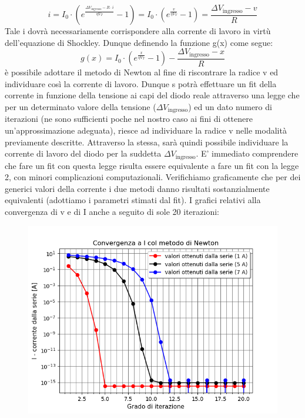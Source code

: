 \documentclass{article}[a4paper, oneside, 11pt]
\begin{document}
\begin{equation}
i = I_0 \cdot ( e^{\frac {\Delta V_{\text{ingresso}} - R \cdot i}{\eta V_T} } - 1) = I_0 \cdot (e^{\frac{v} {\eta V_T}} -1) =  \frac{\Delta V_{\text{ingresso}} - v}{R}
\end{equation}
Tale i dovrà necessariamente corrispondere alla corrente di lavoro in virtù dell’equazione di Shockley. Dunque definendo la funzione g(x) come segue:
\begin{equation}\label{eq: invsck}
g(x) = I_0 \cdot ( e^{\frac{x}{\eta V_T}} - 1)  - \frac {\Delta V_{\text{ingresso}} - x}{R}
\end{equation}
è possibile adottare il metodo di Newton al fine di riscontrare la radice v ed individuare così la corrente di lavoro. 
Dunque s potrà effettuare un fit della corrente in funzione della tensione ai capi del diodo reale attraverso una legge che per un determinato valore della tensione ($\Delta V_{\text{ingresso}}$) ed un dato numero di iterazioni (ne sono sufficienti poche nel nostro caso ai fini di ottenere un’approssimazione adeguata), riesce ad individuare la radice v  nelle modalità previamente descritte. Attraverso la stessa, sarà quindi possibile individuare la corrente di lavoro del diodo per la suddetta $\Delta V_{\text{ingresso}}$. 
E’ immediato comprendere che fare un fit con questa legge risulta essere equivalente a fare un fit con la legge 2, con minori complicazioni computazionali. Verifichiamo graficamente che per dei generici valori della corrente  i due metodi danno risultati sostanzialmente equivalenti (adottiamo i parametri stimati dal fit). I grafici relativi alla convergenza di v e di I anche a seguito di sole 20 iterazioni:
\begin{figure}[H]
	\centering 
 		\includegraphics[scale=0.75]{./Figura2_appendiceB.png}
\end{figure}
\end{document}
